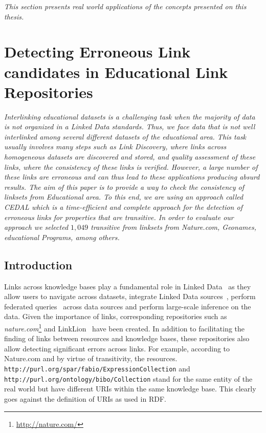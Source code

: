 \textit{This section presents real world applications of the concepts presented on this thesis.}

\section{Detecting Erroneous Link candidates in Educational Link Repositories}

\textit{Interlinking educational datasets is a challenging task when the majority of data is not organized in a Linked Data standards. Thus, we face data that is not well interlinked among several different datasets of the educational area. This task usually involves many steps such as Link Discovery, where links across homogeneous datasets are discovered and stored, and quality assessment of these links, where the consistency of these links is verified. 
    However, a large number of these links are erroneous and can thus lead to these applications producing absurd results.
    The aim of this paper is to provide a way to check the consistency of linksets from Educational area. To this end, we are using an approach called CEDAL which is a time-efficient and complete approach for the detection of erroneous links for properties that are transitive.
    In order to evaluate our approach we selected $1,049$ transitive from linksets from Nature.com, Geonames, educational Programs, among others.}

\subsection{Introduction}
Links across knowledge bases play a fundamental role in Linked Data~\cite{Albertoni:2013:ALQ:2457317.2457327} as they  allow users to navigate across datasets, integrate Linked Data sources~\cite{NgomoSL14}, perform federated queries~\cite{saleem2013daw} across data sources and perform large-scale inference on the data.
Given the importance of links, corresponding repositories such as \emph{nature.com}\footnote{\url{http://nature.com/}} and LinkLion~\cite{nentwig2014linklion} have been created. 
In addition to facilitating the finding of links between  resources and knowledge bases, these repositories also allow detecting significant errors across links. 
For example, according to Nature.com and by virtue of transitivity, the resources. \texttt{http://purl.org/spar/fabio/ExpressionCollection} and \texttt{http://purl.org/ontology/bibo/Collection} stand for the same entity of the real world but have different URIs within the same knowledge base. 
This clearly goes against the definition of URIs as used in RDF.

